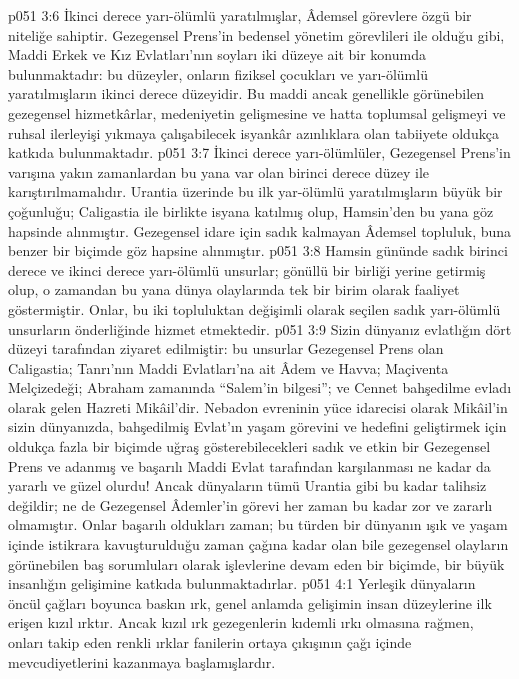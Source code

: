 \vs p051 3:6 İkinci derece yarı\hyp{}ölümlü yaratılmışlar, Âdemsel görevlere özgü bir niteliğe sahiptir. Gezegensel Prens’in bedensel yönetim görevlileri ile olduğu gibi, Maddi Erkek ve Kız Evlatları’nın soyları iki düzeye ait bir konumda bulunmaktadır: bu düzeyler, onların fiziksel çocukları ve yarı\hyp{}ölümlü yaratılmışların ikinci derece düzeyidir. Bu maddi ancak genellikle görünebilen gezegensel hizmetkârlar, medeniyetin gelişmesine ve hatta toplumsal gelişmeyi ve ruhsal ilerleyişi yıkmaya çalışabilecek isyankâr azınlıklara olan tabiiyete oldukça katkıda bulunmaktadır.
\vs p051 3:7 İkinci derece yarı\hyp{}ölümlüler, Gezegensel Prens’in varışına yakın zamanlardan bu yana var olan birinci derece düzey ile karıştırılmamalıdır. Urantia üzerinde bu ilk yar\hyp{}ölümlü yaratılmışların büyük bir çoğunluğu; Caligastia ile birlikte isyana katılmış olup, Hamsin’den bu yana göz hapsinde alınmıştır. Gezegensel idare için sadık kalmayan Âdemsel topluluk, buna benzer bir biçimde göz hapsine alınmıştır.
\vs p051 3:8 Hamsin gününde sadık birinci derece ve ikinci derece yarı\hyp{}ölümlü unsurlar; gönüllü bir birliği yerine getirmiş olup, o zamandan bu yana dünya olaylarında tek bir birim olarak faaliyet göstermiştir. Onlar, bu iki topluluktan değişimli olarak seçilen sadık yarı\hyp{}ölümlü unsurların önderliğinde hizmet etmektedir.
\vs p051 3:9 Sizin dünyanız evlatlığın dört düzeyi tarafından ziyaret edilmiştir: bu unsurlar Gezegensel Prens olan Caligastia; Tanrı’nın Maddi Evlatları’na ait Âdem ve Havva; Maçiventa Melçizedeği; Abraham zamanında “Salem’in bilgesi”; ve Cennet bahşedilme evladı olarak gelen Hazreti Mikâil’dir. Nebadon evreninin yüce idarecisi olarak Mikâil’in sizin dünyanızda, bahşedilmiş Evlat’ın yaşam görevini ve hedefini geliştirmek için oldukça fazla bir biçimde uğraş gösterebilecekleri sadık ve etkin bir Gezegensel Prens ve adanmış ve başarılı Maddi Evlat tarafından karşılanması ne kadar da yararlı ve güzel olurdu! Ancak dünyaların tümü Urantia gibi bu kadar talihsiz değildir; ne de Gezegensel Âdemler’in görevi her zaman bu kadar zor ve zararlı olmamıştır. Onlar başarılı oldukları zaman; bu türden bir dünyanın ışık ve yaşam içinde istikrara kavuşturulduğu zaman çağına kadar olan bile gezegensel olayların görünebilen baş sorumluları olarak işlevlerine devam eden bir biçimde, bir büyük insanlığın gelişimine katkıda bulunmaktadırlar.
\vs p051 4:1 Yerleşik dünyaların öncül çağları boyunca baskın ırk, genel anlamda gelişimin insan düzeylerine ilk erişen kızıl ırktır. Ancak kızıl ırk gezegenlerin kıdemli ırkı olmasına rağmen, onları takip eden renkli ırklar fanilerin ortaya çıkışının çağı içinde mevcudiyetlerini kazanmaya başlamışlardır.
